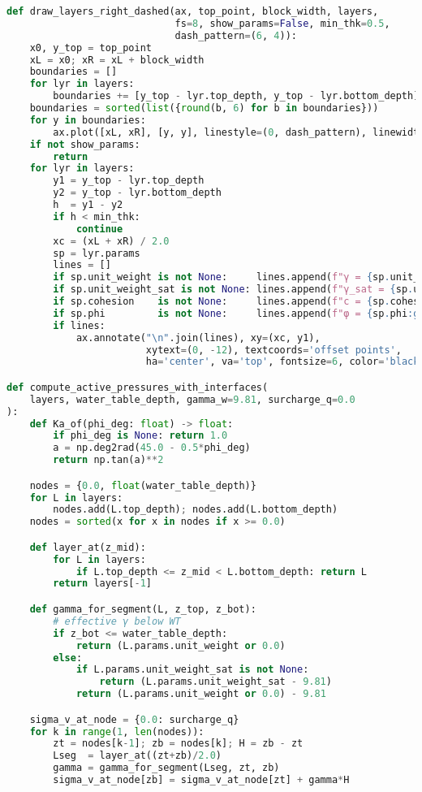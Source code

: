 \begin{lstlisting}[language=Python]
def draw_layers_right_dashed(ax, top_point, block_width, layers,
                             fs=8, show_params=False, min_thk=0.5,
                             dash_pattern=(6, 4)):
    x0, y_top = top_point
    xL = x0; xR = xL + block_width
    boundaries = []
    for lyr in layers:
        boundaries += [y_top - lyr.top_depth, y_top - lyr.bottom_depth]
    boundaries = sorted(list({round(b, 6) for b in boundaries}))
    for y in boundaries:
        ax.plot([xL, xR], [y, y], linestyle=(0, dash_pattern), linewidth=1.2, color="black")
    if not show_params:
        return
    for lyr in layers:
        y1 = y_top - lyr.top_depth
        y2 = y_top - lyr.bottom_depth
        h  = y1 - y2
        if h < min_thk: 
            continue
        xc = (xL + xR) / 2.0
        sp = lyr.params
        lines = []
        if sp.unit_weight is not None:     lines.append(f"γ = {sp.unit_weight:g} kN/m³")
        if sp.unit_weight_sat is not None: lines.append(f"γ_sat = {sp.unit_weight_sat:g} kN/m³")
        if sp.cohesion    is not None:     lines.append(f"c = {sp.cohesion:g} kPa")
        if sp.phi         is not None:     lines.append(f"φ = {sp.phi:g}°")
        if lines:
            ax.annotate("\n".join(lines), xy=(xc, y1),
                        xytext=(0, -12), textcoords='offset points',
                        ha='center', va='top', fontsize=6, color='black')

def compute_active_pressures_with_interfaces(
    layers, water_table_depth, gamma_w=9.81, surcharge_q=0.0
):
    def Ka_of(phi_deg: float) -> float:
        if phi_deg is None: return 1.0
        a = np.deg2rad(45.0 - 0.5*phi_deg)
        return np.tan(a)**2

    nodes = {0.0, float(water_table_depth)}
    for L in layers:
        nodes.add(L.top_depth); nodes.add(L.bottom_depth)
    nodes = sorted(x for x in nodes if x >= 0.0)

    def layer_at(z_mid):
        for L in layers:
            if L.top_depth <= z_mid < L.bottom_depth: return L
        return layers[-1]

    def gamma_for_segment(L, z_top, z_bot):
        # effective γ below WT
        if z_bot <= water_table_depth:
            return (L.params.unit_weight or 0.0)
        else:
            if L.params.unit_weight_sat is not None:
                return (L.params.unit_weight_sat - 9.81)
            return (L.params.unit_weight or 0.0) - 9.81

    sigma_v_at_node = {0.0: surcharge_q}
    for k in range(1, len(nodes)):
        zt = nodes[k-1]; zb = nodes[k]; H = zb - zt
        Lseg  = layer_at((zt+zb)/2.0)
        gamma = gamma_for_segment(Lseg, zt, zb)
        sigma_v_at_node[zb] = sigma_v_at_node[zt] + gamma*H


\end{lstlisting}
